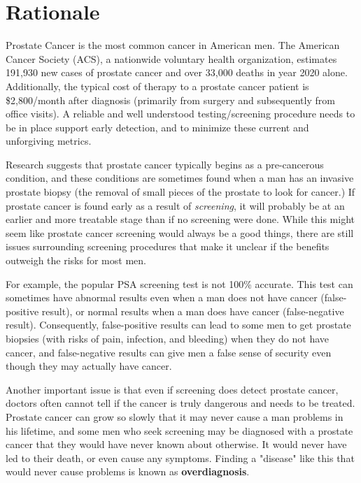%
%
%

\section{Rationale}

Prostate Cancer is the most common cancer in American men. The American Cancer Society (ACS), a nationwide voluntary health organization, estimates 191,930 new cases of prostate cancer and over 33,000 deaths in year 2020 alone. Additionally, the typical cost of therapy to a prostate cancer patient is \$2,800/month after diagnosis (primarily from surgery and subsequently from office visits). A reliable and well understood testing/screening procedure needs to be in place support early detection, and to minimize these current and unforgiving metrics. \par

Research suggests that prostate cancer typically begins as a pre-cancerous condition, and these conditions are sometimes found when a man has an invasive prostate biopsy (the removal of small pieces of the prostate to look for cancer.) If prostate cancer is found early as a result of \textit{screening}, it will probably be at an earlier and more treatable stage than if no screening were done. While this might seem like prostate cancer screening would always be a good things, there are still issues surrounding screening procedures that make it unclear if the benefits outweigh the risks for most men. \par

For example, the popular PSA screening test is not 100\% accurate. This test can sometimes have abnormal results even when a man does not have cancer (false-positive result), or normal results when a man does have cancer (false-negative result). Consequently, false-positive results can lead to some men to get prostate biopsies (with risks of pain, infection, and bleeding) when they do not have cancer, and false-negative results can give men a false sense of security even though they may actually have cancer. \par

Another important issue is that even if screening does detect prostate cancer, doctors often cannot tell if the cancer is truly dangerous and needs to be treated. Prostate cancer can grow so slowly that it may never cause a man problems in his lifetime, and some men who seek screening may be diagnosed with a prostate cancer that they would have never known about otherwise. It would never have led to their death, or even cause any symptoms. Finding a "disease" like this that would never cause problems is known as \textbf{overdiagnosis}. \par

